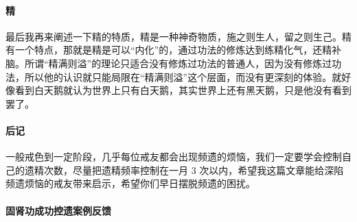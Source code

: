 \documentclass[fontset=founder]{ctexart}
\begin{document}
\paragraph{精}

最后我再来阐述一下精的特质，精是一种神奇物质，施之则生人，留之则生己。精有一个特点，那就是精是可以“内化”的，通过功法的修炼达到练精化气，还精补脑。所谓“精满则溢”的理论只适合没有修炼过功法的普通人，因为没有修炼过功法，所以他的认识就只能局限在“精满则溢”这个层面，而没有更深刻的体验。就好像看到白天鹅就认为世界上只有白天鹅，其实世界上还有黑天鹅，只是他没有看到罢了。

\paragraph{后记}

一般戒色到一定阶段，几乎每位戒友都会出现频遗的烦恼，我们一定要学会控制自己的遗精次数，尽量把遗精频率控制在一月 3 次以内，希望我这篇文章能给深陷频遗烦恼的戒友带来启示，希望你们早日摆脱频遗的困扰。


\paragraph{固肾功成功控遗案例反馈}
\end{document}
